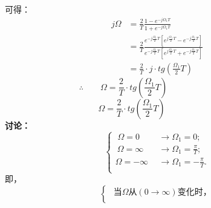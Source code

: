 \documentclass[notheorems,compress,mathserif,table]{beamer}
\begin{document}
\begin{frame}[allowframebreaks]
\begin{enumerate}
          可得：
          \begin{equation*}
            \begin{split}
               j\Omega &= \frac{2}{T}\frac{1-e^{-j\Omega_1 T}}{1+e^{-j\Omega_1 T}} \\
                       &= \frac{2}{T}\frac{e^{-j\frac{\Omega_1}{2}T}\left[
                         e^{j\frac{\Omega_1}{2}T}-e^{-j\frac{\Omega_1}{2}T}\right]}
                         {e^{-j\frac{\Omega_1}{2}T}\left[
                         e^{j\frac{\Omega_1}{2}T}+e^{-j\frac{\Omega_1}{2}T}\right]}\\
                       &= \frac{2}{T}\cdot j\cdot tg(\frac{\Omega_1}{2}T)
             \end{split}
          \end{equation*}
          $$\therefore\quad\quad
          \Omega = \frac{2}{T} \cdot tg(\frac{\Omega_1}{2}T)\quad\quad\quad\quad\quad\quad\quad\quad$$
          \newpage
          $$\quad\quad
          \Omega = \frac{2}{T} \cdot tg(\frac{\Omega_1}{2}T)\quad\quad\quad\quad\quad\quad\quad\quad$$
          \textbf{讨论：}
          $$
          \left\{\begin{aligned}
            \;\Omega = 0 \quad      &\longrightarrow \Omega_1 = 0;\\
            \:\Omega = \infty\quad  &\longrightarrow \Omega_1 = \frac{\pi}{T};\\
            \Omega = -\infty &\longrightarrow \Omega_1 = -\frac{\pi}{T}.\\
          \end{aligned} \right.
          $$
          即，
          $$
          \left\{\begin{aligned}
            \mbox{ 当$\Omega$从$(0\rightarrow\infty)$变化时，}\\

\end{aligned}$$
\end{enumerate}
\end{frame}
\end{document}
